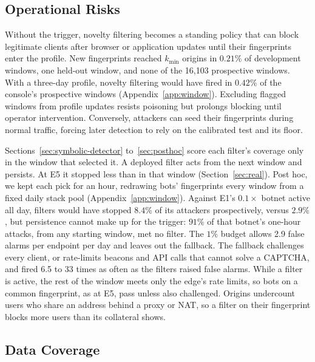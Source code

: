 \documentclass[conference,letterpaper,10pt]{IEEEtran}
\newcommand\1{\textit{(i)}}
\newcommand\2{\textit{(ii)}}
\newcommand\3{\textit{(iii)}}
\newcommand\4{\textit{(iv)}}
\newcommand\5{\textit{(v)}}
\newcommand\6{\textit{(vi)}}
\newcommand\7{\textit{(vii)}}
\newcommand\8{\textit{(viii)}}
\newcommand\9{\textit{(ix)}}
\begin{document}
\subsection{Operational Risks}

Without the trigger, novelty filtering becomes a standing policy that can block legitimate clients after browser or application updates until their fingerprints enter the profile. New fingerprints reached $k_{\min}$ origins in $0.21\%$ of development windows, one held-out window, and none of the 16,103 prospective windows. With a three-day profile, novelty filtering would have fired in $0.42\%$ of the console's prospective windows (Appendix~\ref{app:window}). Excluding flagged windows from profile updates resists poisoning but prolongs blocking until operator intervention. Conversely, attackers can seed their fingerprints during normal traffic, forcing later detection to rely on the calibrated test and its floor.

Sections~\ref{sec:symbolic-detector} to~\ref{sec:posthoc} score each filter's coverage only in the window that selected it. A deployed filter acts from the next window and persists. At E5 it stopped less than in that window (Section~\ref{sec:real}). Post hoc, we kept each pick for an hour, redrawing bots' fingerprints every window from a fixed daily stack pool (Appendix~\ref{app:window}). Against E1's $0.1\times$ botnet active all day, filters would have stopped $8.4\%$ of its attackers prospectively, versus $2.9\%$, but persistence cannot make up for the trigger: $91\%$ of that botnet's one-hour attacks, from any starting window, met no filter. The $1\%$ budget allows 2.9 false alarms per endpoint per day and leaves out the fallback. The fallback challenges every client, or rate-limits beacons and API calls that cannot solve a CAPTCHA, and fired 6.5 to 33 times as often as the filters raised false alarms. While a filter is active, the rest of the window meets only the edge's rate limits, so bots on a common fingerprint, as at E5, pass unless also challenged. Origins undercount users who share an address behind a proxy or NAT, so a filter on their fingerprint blocks more users than its collateral shows.

\subsection{Data Coverage}
\end{document}
